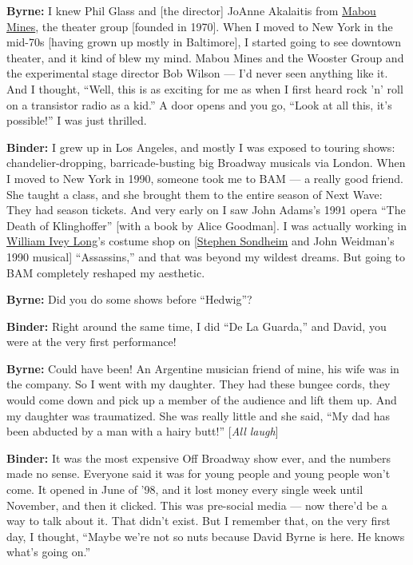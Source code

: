 \textbf{Byrne:} I knew Phil Glass and {[}the director{]} JoAnne
Akalaitis from
\href{https://www.nytimes3xbfgragh.onion/2007/08/31/theater/31mabo.html}{Mabou
Mines}, the theater group {[}founded in 1970{]}. When I moved to New
York in the mid-70s {[}having grown up mostly in Baltimore{]}, I started
going to see downtown theater, and it kind of blew my mind. Mabou Mines
and the Wooster Group and the experimental stage director Bob Wilson ---
I'd never seen anything like it. And I thought, ``Well, this is as
exciting for me as when I first heard rock 'n' roll on a transistor
radio as a kid.'' A door opens and you go, ``Look at all this, it's
possible!'' I was just thrilled.

\textbf{Binder:} I grew up in Los Angeles, and mostly I was exposed to
touring shows: chandelier-dropping, barricade-busting big Broadway
musicals via London. When I moved to New York in 1990, someone took me
to BAM --- a really good friend. She taught a class, and she brought
them to the entire season of Next Wave: They had season tickets. And
very early on I saw John Adams's 1991 opera ``The Death of Klinghoffer''
{[}with a book by Alice Goodman{]}. I was actually working in
\href{https://www.nytimes3xbfgragh.onion/2006/01/29/magazine/william-ivey-long-keeps-his-clothes-on.html}{William
Ivey Long}'s costume shop on
{[}\href{https://www.nytimes3xbfgragh.onion/2017/10/16/t-magazine/lin-manuel-miranda-stephen-sondheim.html}{Stephen
Sondheim} and John Weidman's 1990 musical{]} ``Assassins,'' and that was
beyond my wildest dreams. But going to BAM completely reshaped my
aesthetic.

\textbf{Byrne:} Did you do some shows before ``Hedwig''?

\textbf{Binder:} Right around the same time, I did ``De La Guarda,'' and
David, you were at the very first performance!

\textbf{Byrne:} Could have been! An Argentine musician friend of mine,
his wife was in the company. So I went with my daughter. They had these
bungee cords, they would come down and pick up a member of the audience
and lift them up. And my daughter was traumatized. She was really little
and she said, ``My dad has been abducted by a man with a hairy butt!''
{[}\emph{All laugh}{]}

\textbf{Binder:} It was the most expensive Off Broadway show ever, and
the numbers made no sense. Everyone said it was for young people and
young people won't come. It opened in June of '98, and it lost money
every single week until November, and then it clicked. This was
pre-social media --- now there'd be a way to talk about it. That didn't
exist. But I remember that, on the very first day, I thought, ``Maybe
we're not so nuts because David Byrne is here. He knows what's going
on.''

